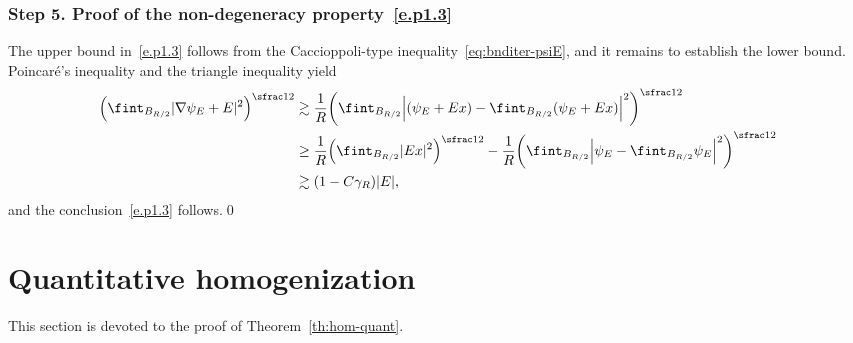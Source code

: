 \documentclass[10pt]{amsart}
\theoremstyle{plain}
\theoremstyle{definition}
\newcommand{\step}[1]{\subsubsection*{Step #1}}
\begin{document}
\step{5. Proof of the non-degeneracy property~\eqref{e.p1.3}}
The upper bound in~\eqref{e.p1.3} follows from the Caccioppoli-type inequality~\eqref{eq:bnditer-psiE}, and it remains to establish the lower bound.
Poincaré's inequality and the triangle inequality yield
\begin{align*}
\Big(\fint_{B_{R/2}}|\nabla \psi_E+E|^2\Big)^{\sfrac12}&\gtrsim \frac1{R} \bigg(\fint_{B_{R/2}}\Big|(\psi_E+Ex)-\fint_{B_{R/2}}(\psi_E+Ex)\Big|^2\bigg)^{\sfrac12}
\\
&\ge \frac1{R} \Big(\fint_{B_{R/2}}|E x|^2\Big)^{\sfrac12} - \frac1{R} \bigg(\fint_{B_{R/2}}\Big| \psi_E-\fint_{B_{R/2}} \psi_E\Big|^2\bigg)^{\sfrac12}\\
&\gtrsim(1-C\gamma_R)|E|,
\end{align*}
and the conclusion~\eqref{e.p1.3} follows.\qed

\section{Quantitative homogenization}
This section is devoted to the proof of Theorem~\ref{th:hom-quant}.
\end{document}
